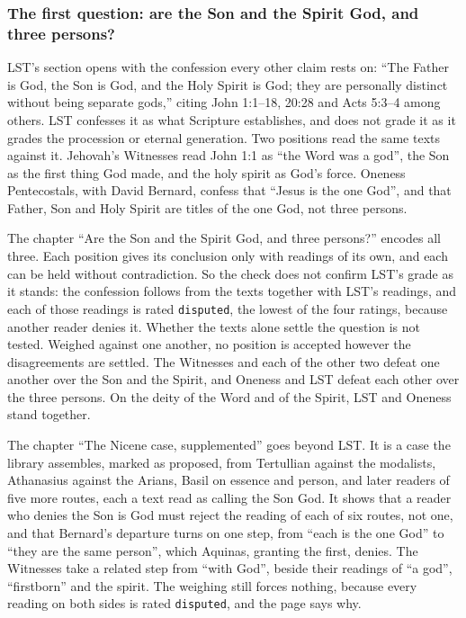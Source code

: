 \documentclass[11pt,paper=\testimonypaper,DIV=13,parskip=false]{scrartcl}
\begin{document}
\subsubsection*{The first question: are the Son and the Spirit God, and three persons?}
LST’s section opens with the confession every other claim rests on: “The Father is God, the Son is God, and the Holy Spirit is God; they are personally distinct without being separate gods,” citing John 1:1–18, 20:28 and Acts 5:3–4 among others. LST confesses it as what Scripture establishes, and does not grade it as it grades the procession or eternal generation. Two positions read the same texts against it. Jehovah’s Witnesses read John 1:1 as “the Word was a god”, the Son as the first thing God made, and the holy spirit as God’s force. Oneness Pentecostals, with David Bernard, confess that “Jesus is the one God”, and that Father, Son and Holy Spirit are titles of the one God, not three persons.

The chapter “Are the Son and the Spirit God, and three persons?” encodes all three. Each position gives its conclusion only with readings of its own, and each can be held without contradiction. So the check does not confirm LST’s grade as it stands: the confession follows from the texts together with LST’s readings, and each of those readings is rated \texttt{disputed}, the lowest of the four ratings, because another reader denies it. Whether the texts alone settle the question is not tested. Weighed against one another, no position is accepted however the disagreements are settled. The Witnesses and each of the other two defeat one another over the Son and the Spirit, and Oneness and LST defeat each other over the three persons. On the deity of the Word and of the Spirit, LST and Oneness stand together.

The chapter “The Nicene case, supplemented” goes beyond LST. It is a case the library assembles, marked as proposed, from Tertullian against the modalists, Athanasius against the Arians, Basil on essence and person, and later readers of five more routes, each a text read as calling the Son God. It shows that a reader who denies the Son is God must reject the reading of each of six routes, not one, and that Bernard’s departure turns on one step, from “each is the one God” to “they are the same person”, which Aquinas, granting the first, denies. The Witnesses take a related step from “with God”, beside their readings of “a god”, “firstborn” and the spirit. The weighing still forces nothing, because every reading on both sides is rated \texttt{disputed}, and the page says why.
\end{document}
